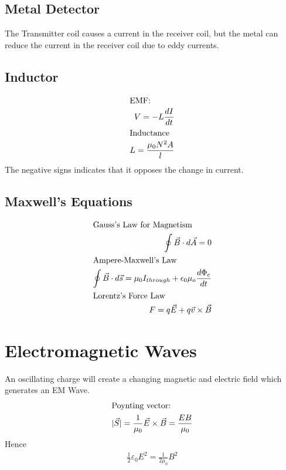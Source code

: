 \documentclass[12pt]{article}
\numberwithin{equation}{section}
\begin{document}
\subsection{Metal Detector}
The Transmitter coil causes a current in the receiver coil, but the metal can reduce the current in the receiver coil due to eddy currents.

\subsection{Inductor}
\begin{align}
\intertext{EMF:}
V=-L\frac{dI}{dt}\\
\intertext{Inductance}
L=\frac{\mu_0 N^2 A}{l}
\end{align}
The negative signs indicates that it opposes the change in current.

\subsection{Maxwell's Equations}
\begin{align}
\intertext{Gauss's Law for Magnetism}
\oint \vec{B} \cdot d \vec{A} =0  \\
\intertext{Ampere-Maxwell's Law}
\oint \vec{B} \cdot d\vec{s} = \mu_0 I_{through} + \epsilon_0 \mu_o \frac{d \Phi_e}{dt} \\ 
\intertext{Lorentz's Force Law}
F= q \vec{E} + q \vec{v} \times \vec{B} 
\end{align}

\section{Electromagnetic Waves}
An oscillating charge will create a changing magnetic and electric field which generates an EM Wave.
\begin{align}
\intertext{Poynting vector:}
|\vec{S}|=\frac{1}{\mu_0}\vec{E}\times\vec{B}=\frac{EB}{\mu_0}
\end{align}
Hence
\begin{align}
\frac{1}{2}\varepsilon_0 E^2 = \frac{1}{2 \mu_0} B^2
\end{align}
\end{document}
